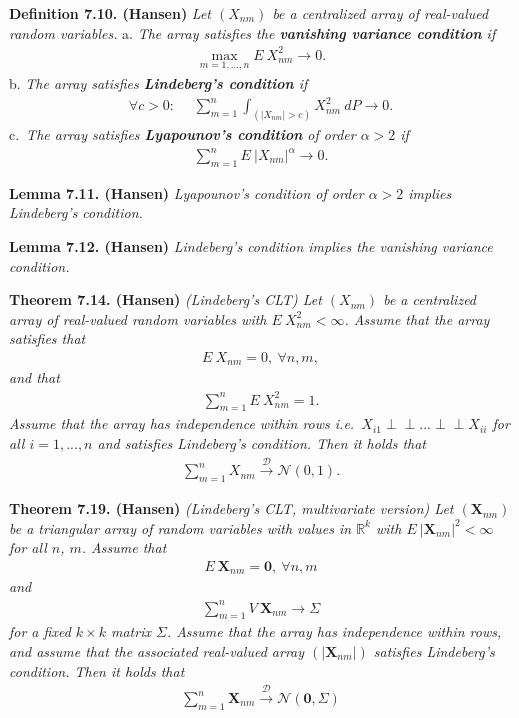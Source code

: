 \documentclass[a4paper,12pt,openany]{book}
\begin{document}
\textbf{Definition 7.10. (Hansen)} \emph{Let \((X_{nm})\) be a centralized array of real-valued random variables.}
a. \emph{The array satisfies the \textbf{vanishing variance condition} if}
\begin{align*}
      \max_{m=1,...,n}E\ X_{nm}^2\to 0.\tag{7.8}
  \end{align*}
b. \emph{The array satisfies \textbf{Lindeberg's condition} if}
\begin{align*}
      \forall c>0:\hspace{15pt}\sum_{m=1}^n\int_{(\vert X_{nm}\vert>c)}X_{nm}^2\ dP\to 0.\tag{7.9}
  \end{align*}
c.~\emph{The array satisfies \textbf{Lyapounov's condition} of order \(\alpha>2\) if}
\begin{align*}
      \sum_{m=1}^nE\ \vert X_{nm}\vert ^\alpha\to 0.\tag{7.10}
  \end{align*}

\textbf{Lemma 7.11. (Hansen)} \emph{Lyapounov's condition of order \(\alpha>2\) implies Lindeberg's condition.}

\textbf{Lemma 7.12. (Hansen)} \emph{Lindeberg's condition implies the vanishing variance condition.}

\textbf{Theorem 7.14. (Hansen)} \emph{(Lindeberg's CLT) Let \((X_{nm})\) be a centralized array of real-valued random variables with \(E\ X_{nm}^2<\infty\). Assume that the array satisfies that}
\begin{align*}
    E\ X_{nm}=0,\ \forall n,m,
\end{align*}
\emph{and that}
\begin{align*}
    \sum_{m=1}^n E\ X^2_{nm}=1.\tag{7.13}
\end{align*}
\emph{Assume that the array has independence within rows i.e.~\(X_{i1}\perp \!\!\! \perp ... \perp \!\!\! \perp X_{ii}\) for all \(i=1,...,n\) and satisfies Lindeberg's condition. Then it holds that}
\begin{align*}
    \sum_{m=1}^nX_{nm}\stackrel{\mathcal{D}}{\to} \mathcal{N}(0,1).
\end{align*}

\textbf{Theorem 7.19. (Hansen)} \emph{(Lindeberg's CLT, multivariate version) Let \((\mathbf{X}_{nm})\) be a triangular array of random variables with values in \(\mathbb{R}^k\) with \(E\ \vert \mathbf{X}_{nm}\vert^2<\infty\) for all \(n\), \(m\). Assume that}
\begin{align*}
    E\ \mathbf{X}_{nm}=\mathbf{0},\ \forall n,m
\end{align*}
\emph{and}
\begin{align*}
    \sum_{m=1}^n V\ \mathbf{X}_{nm}\to \Sigma
\end{align*}
\emph{for a fixed \(k\times k\) matrix \(\Sigma\). Assume that the array has independence within rows, and assume that the associated real-valued array \((\vert\mathbf{X}_{nm}\vert )\) satisfies Lindeberg's condition. Then it holds that}
\begin{align*}
    \sum_{m=1}^n\mathbf{X}_{nm}\stackrel{\mathcal{D}}{\to} \mathcal{N}(\mathbf{0},\Sigma)
\end{align*}
\end{document}
